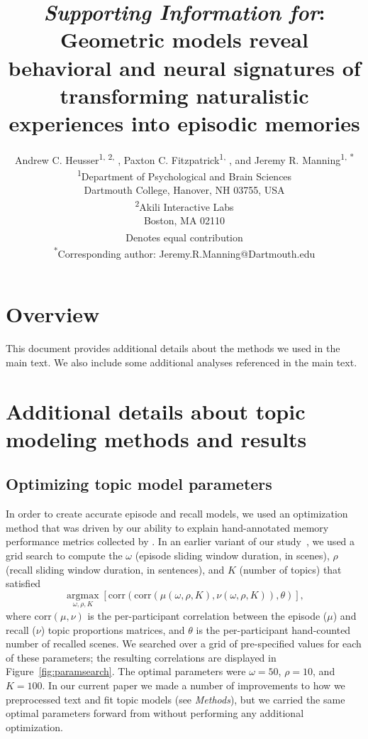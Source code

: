 \documentclass{article}
\title{\textit{Supporting Information for}: Geometric models reveal behavioral and neural signatures of transforming naturalistic experiences into episodic memories}
\author{Andrew C. Heusser\textsuperscript{1, 2, \textdagger}, Paxton C. Fitzpatrick\textsuperscript{1, \textdagger}, and Jeremy R. Manning\textsuperscript{1, *}\\\textsuperscript{1}Department of Psychological and Brain Sciences\\Dartmouth College, Hanover, NH 03755, USA\\\textsuperscript{2}Akili Interactive Labs\\Boston, MA 02110\\\textsuperscript{\textdagger}Denotes equal contribution\\\textsuperscript{*}Corresponding author: Jeremy.R.Manning@Dartmouth.edu}
\newcommand{\argmax}{\mathop{\mathrm{argmax}}\limits}
\begin{document}
\begin{titlepage}
  \maketitle
\end{titlepage}

\setcounter{equation}{0}
\setcounter{figure}{0}
\setcounter{table}{0}
\setcounter{page}{1}
\setcounter{section}{0}
\makeatletter
\renewcommand{\theequation}{S\arabic{equation}}
\renewcommand{\thefigure}{S\arabic{figure}}
\renewcommand{\bibnumfmt}[1]{[S#1]}
\renewcommand{\citenumfont}[1]{S#1}


\section*{Overview}
This document provides additional details about the methods we used in the main text.  We also include some additional analyses referenced in the main text.

\section*{Additional details about topic modeling methods and results}
\subsection*{Optimizing topic model parameters}
In order to create accurate episode and recall models, we used an optimization method that was driven by our ability to explain hand-annotated memory performance metrics collected by \cite{ChenEtal17}.  In an earlier variant of our study~\citep{HeusMann18}, we used a grid search to compute the $\omega$ (episode sliding window duration, in scenes), $\rho$ (recall sliding window duration, in sentences), and $K$ (number of topics) that satisfied
\[
\argmax_{\omega, \rho, K} \left[\mathrm{corr}\left(\mathrm{corr}\left(\mu\left(\omega, \rho, K\right), \nu\left(\omega, \rho, K\right)\right), \theta\right)\right],
\]
where $\mathrm{corr}(\mu, \nu)$ is the per-participant correlation between the episode ($\mu$) and recall ($\nu$) topic proportions matrices, and $\theta$ is the per-participant hand-counted number of recalled scenes.  We searched over a grid of pre-specified values for each of these parameters; the resulting correlations are displayed in Figure~\ref{fig:paramsearch}.  The optimal parameters were $\omega = 50$, $\rho = 10$, and $K = 100$.  In our current paper we made a number of improvements to how we preprocessed text and fit topic models (see \textit{Methods}), but we carried the same optimal parameters forward from \cite{HeusMann18} without performing any additional optimization.
\end{document}
